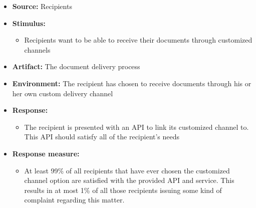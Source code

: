 \documentclass[a4paper,10pt]{article}
\begin{document}
\begin{itemize}
    \item \textbf{Source:} Recipients
    \item \textbf{Stimulus:}
        \begin{itemize}
            \item Recipients want to be able to receive their documents through customized channels
        \end{itemize}

    \item \textbf{Artifact:} The document delivery process
    \item \textbf{Environment:} The recipient has chosen to receive documents through his or her own custom delivery channel
    \item \textbf{Response:}
        \begin{itemize}
            \item The recipient is presented with an API to link its customized channel to. This API should satisfy all of the recipient's needs
        \end{itemize}

    \item \textbf{Response measure:}
        \begin{itemize}
            \item At least 99\% of all recipients that have ever chosen the customized channel option are satisfied with the provided API and service. This results in at most 1\% of all those recipients issuing some kind of complaint regarding this matter.
        \end{itemize}
\end{itemize}
\end{document}
